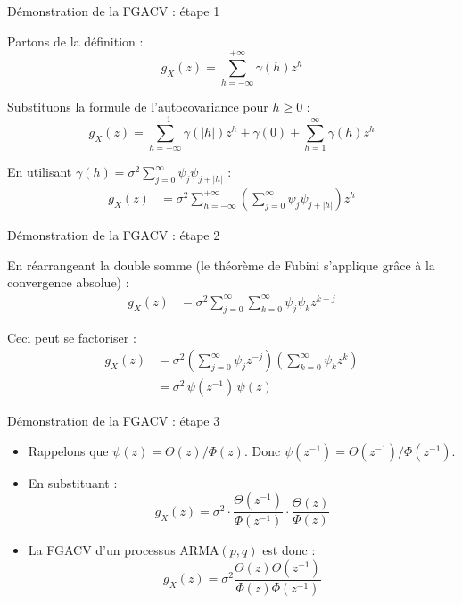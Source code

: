 \documentclass[11pt,aspectratio=169]{beamer}
\begin{document}
\begin{frame}{Démonstration de la FGACV : étape 1}

Partons de la définition :
\[
g_X(z) = \sum_{h=-\infty}^{+\infty} \gamma(h) z^h
\]

Substituons la formule de l'autocovariance pour $h \geq 0$ :
\[
g_X(z) = \sum_{h=-\infty}^{-1} \gamma(|h|) z^h + \gamma(0) + \sum_{h=1}^{\infty} \gamma(h) z^h
\]

En utilisant $\gamma(h) = \sigma^2 \sum_{j=0}^{\infty} \psi_j \psi_{j+|h|}$ :
\begin{align*}
g_X(z) &= \sigma^2 \sum_{h=-\infty}^{+\infty} \left( \sum_{j=0}^{\infty} \psi_j \psi_{j+|h|} \right) z^h
\end{align*}

\end{frame}

\begin{frame}{Démonstration de la FGACV : étape 2}

En réarrangeant la double somme (le théorème de Fubini s'applique grâce à la convergence absolue) :
\begin{align*}
g_X(z) &= \sigma^2 \sum_{j=0}^{\infty} \sum_{k=0}^{\infty} \psi_j \psi_k z^{k-j}
\end{align*}

Ceci peut se factoriser :
\begin{align*}
g_X(z) &= \sigma^2 \left( \sum_{j=0}^{\infty} \psi_j z^{-j} \right) \left( \sum_{k=0}^{\infty} \psi_k z^k \right) \\[1em]
&= \sigma^2 \, \psi(z^{-1}) \, \psi(z)
\end{align*}

\end{frame}

\begin{frame}{Démonstration de la FGACV : étape 3}

\begin{itemize}

\item Rappelons que $\psi(z) = \Theta(z)/\Phi(z)$. Donc $\psi(z^{-1}) = \Theta(z^{-1})/\Phi(z^{-1})$.\newline

\item En substituant :
  \[
  g_X(z) = \sigma^2 \cdot \frac{\Theta(z^{-1})}{\Phi(z^{-1})} \cdot \frac{\Theta(z)}{\Phi(z)}
  \]\newline

\item La FGACV d'un processus ARMA$(p,q)$ est donc :
  \[
  \boxed{g_X(z) = \sigma^2 \frac{\Theta(z)\Theta(z^{-1})}{\Phi(z)\Phi(z^{-1})}}
  \]

\end{itemize}

\end{frame}
\end{document}
